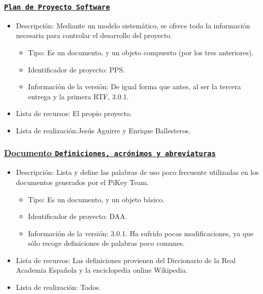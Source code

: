 \documentclass[spanish,a4paper,11pt, twoside]{report}	%
\begin{document}
			\subsubsection{\underline{\texttt{Plan de Proyecto Software}}}
			\begin{itemize}	
				\item{Descripción:} Mediante un modelo sistemático, se ofrece toda la información necesaria para controlar el desarrollo del proyecto.
					\begin{itemize}	
						\item{Tipo:} Es un documento, y un objeto compuesto (por los tres anteriores). 
						\item{Identificador de proyecto:} PPS.
						\item{Información de la versión:} De igual forma que antes, al ser la tercera entrega y la primera RTF, 3.0.1.
					\end{itemize}	
				\item{Lista de recursos:} El propio proyecto.
				\item{Lista de realización:}Jesús Aguirre y Enrique Ballesteros.
			\end{itemize}	

			\subsubsection{\underline{Documento \texttt{Definiciones, acrónimos y abreviaturas}}}
			\begin{itemize}	
				\item{Descripción:} Lista y define las palabras de uso poco frecuente utilizadas en los documentos generados por el PiKey Team.
					\begin{itemize}	
						\item{Tipo:} Es un documento, y un objeto básico. 
						\item{Identificador de proyecto:} DAA.
						\item{Información de la versión:} 3.0.1. Ha sufrido pocas modificaciones, ya que sólo recoge definiciones de palabras poco comunes.
					\end{itemize}	
				\item{Lista de recursos:} Las definiciones provienen del Diccionario de la Real Academia Española y la enciclopedia online Wikipedia.
				\item{Lista de realización:} Todos.
			\end{itemize}		
\end{document}
